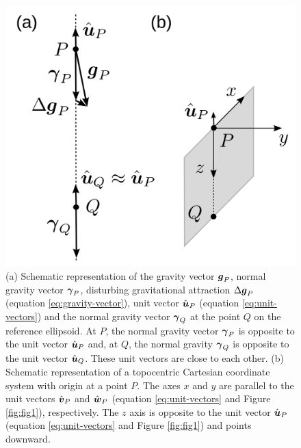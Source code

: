 \documentclass[extra]{gji}
\begin{document}
\begin{figure}
    \includegraphics{figures/local-system.png}
    \caption{(a) Schematic representation of the gravity vector
    $\mitbf{g}_{P}$, normal gravity vector $\mitbf{\gamma}_{P}$,
    disturbing gravitational attraction $\Delta \mitbf{g}_{P}$
    (equation \ref{eq:gravity-vector}), unit vector 
    $\hat{\mitbf{u}}_{P}$ (equation \ref{eq:unit-vectors}) and
    the normal gravity vector $\mitbf{\gamma}_{Q}$ at the point $Q$ on the reference ellipsoid.
    At $P$, the normal gravity vector $\mitbf{\gamma}_{P}$ 
    is opposite to the unit vector $\hat{\mitbf{u}}_{P}$ and, at $Q$, the normal gravity $\mitbf{\gamma}_{Q}$ is opposite
    to the unit vector $\hat{\mitbf{u}}_{Q}$. These unit vectors are
    close to each other.
    (b) Schematic representation of a topocentric Cartesian 
    coordinate system with origin at a point $P$. The axes $x$
    and $y$ are parallel to the unit vectors $\hat{\mitbf{v}}_{P}$
    and $\hat{\mitbf{w}}_{P}$ (equation \ref{eq:unit-vectors} and
    Figure \ref{fig:fig1}), respectively. The $z$ axis is opposite
    to the unit vector $\hat{\mitbf{u}}_{P}$ (equation 
    \ref{eq:unit-vectors} and Figure \ref{fig:fig1}) and points downward.}
  \label{fig:fig2}
\end{figure}

\label{lastpage}
\end{document}
